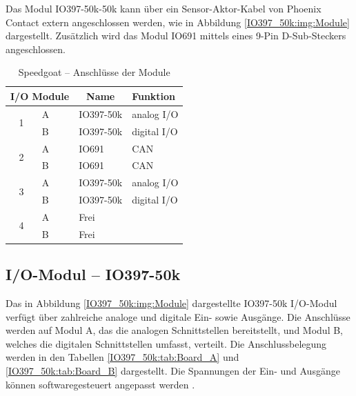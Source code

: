 Das Modul IO397-50k-50k kann über ein Sensor-Aktor-Kabel von Phoenix Contact extern angeschlossen werden, wie in Abbildung \ref{IO397_50k:img:Module} dargestellt.
Zusätzlich wird das Modul IO691 mittels eines 9-Pin D-Sub-Steckers angeschlossen.
\pagebreak[1]
\begin{table}[!ht]
	\centering
	\caption{Speedgoat – Anschlüsse der Module}
	\label{speedgoat:tab:Module}
	\begin{tabular}{clll}
		\hline
		\multicolumn{2}{c}{\textbf{I/O Module}} & \multicolumn{1}{c}{\textbf{Name}} & \textbf{Funktion}               \\ \hline
		\multirow{2}{*}{1}                      & \multicolumn{1}{l|}{A}            & IO397-50k         & analog I/O  \\
		                                        & \multicolumn{1}{l|}{B}            & IO397-50k         & digital I/O \\ \hline
		\multirow{2}{*}{2}                      & \multicolumn{1}{l|}{A}            & IO691             & CAN         \\
		                                        & \multicolumn{1}{l|}{B}            & IO691             & CAN         \\ \hline
		\multirow{2}{*}{3}                      & \multicolumn{1}{l|}{A}            & IO397-50k         & analog I/O  \\
		                                        & \multicolumn{1}{l|}{B}            & IO397-50k         & digital I/O \\ \hline
		\multirow{2}{*}{4}                      & \multicolumn{1}{l|}{A}            & Frei              &             \\
		                                        & \multicolumn{1}{l|}{B}            & Frei              &             \\ \hline
	\end{tabular}
\end{table}
\pagebreak[4]




\subsection{I/O-Modul – IO397-50k}
\label{section:IO397_50k}

Das in Abbildung \ref{IO397_50k:img:Module} dargestellte IO397-50k I/O-Modul verfügt über zahlreiche analoge und digitale Ein- sowie Ausgänge. Die Anschlüsse werden auf Modul A, das die analogen Schnittstellen bereitstellt, und Modul B, welches die digitalen Schnittstellen umfasst, verteilt. Die Anschlussbelegung werden in den Tabellen \ref{IO397_50k:tab:Board_A} und \ref{IO397_50k:tab:Board_B} dargestellt. Die Spannungen der Ein- und Ausgänge können softwaregesteuert angepasst werden \cite{speedgoat:IO397_50k}.

